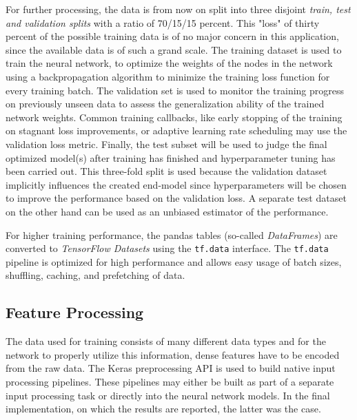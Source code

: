 \documentclass[10pt,final,journal,a4paper,oneside,twocolumn]{IEEEtran}
\begin{document}

For further processing, the data is from now on split into three disjoint \emph{train, test and validation splits} with a ratio of 70/15/15 percent.
This "loss" of thirty percent of the possible training data is of no major concern in this application, since the available data is of such a grand scale.
The training dataset is used to train the neural network, to optimize the weights of the nodes in the network using a backpropagation algorithm to minimize the training loss function for every training batch. The validation set is used to monitor the training progress on previously unseen data to assess the generalization ability of the trained network weights. Common training callbacks, like early stopping of the training on stagnant loss improvements, or adaptive learning rate scheduling may use the validation loss metric.
Finally, the test subset will be used to judge the final optimized model(s) after training has finished and hyperparameter tuning has been carried out. This three-fold split is used because the validation dataset implicitly influences the created end-model since hyperparameters will be chosen to improve the performance based on the validation loss. A separate test dataset on the other hand can be used as an unbiased estimator of the performance.

For higher training performance, the pandas tables (so-called \emph{DataFrames}) are converted to \emph{TensorFlow Datasets} using the \texttt{tf.data} interface. The \texttt{tf.data} pipeline is optimized for high performance and allows easy usage of batch sizes, shuffling, caching, and prefetching of data\footnotemark.

\subsection{Feature Processing}
The data used for training consists of many different data types and for the network to properly utilize this information, dense features have to be encoded from the raw data. The Keras preprocessing API is used to build native input processing pipelines\footnotemark. These pipelines may either be built as part of a separate input processing task or directly into the neural network models. In the final implementation, on which the results are reported, the latter was the case.
\end{document}
